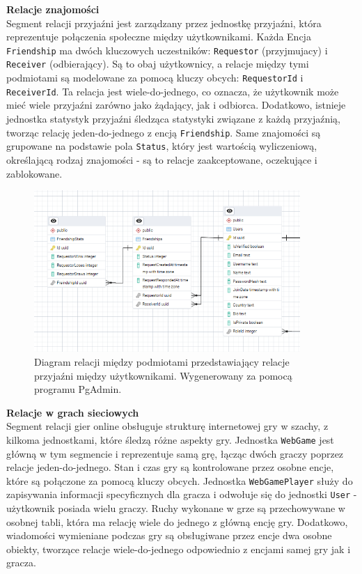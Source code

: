 \documentclass[12pt,a4paper]{article}
\begin{document}
\newpage

\noindent \textbf{Relacje znajomości}\\
Segment relacji przyjaźni jest zarządzany przez jednostkę przyjaźni, która reprezentuje połączenia społeczne między użytkownikami. Każda Encja \texttt{Friendship} ma dwóch kluczowych uczestników: \texttt{Requestor} (przyjmujacy) i \texttt{Receiver} (odbierający). Są to obaj użytkownicy, a relacje między tymi podmiotami są modelowane za pomocą kluczy obcych: \texttt{RequestorId} i \texttt{ReceiverId}. Ta relacja jest wiele-do-jednego, co oznacza, że użytkownik może mieć wiele przyjaźni zarówno jako żądający, jak i odbiorca. Dodatkowo, istnieje jednostka statystyk przyjaźni śledząca statystyki związane z każdą przyjaźnią, tworząc relację jeden-do-jednego z encją \texttt{Friendship}. Same znajomości są grupowane na podstawie pola \texttt{Status}, który jest wartością wyliczeniową, określającą rodzaj znajomości - są to relacje zaakceptowane, oczekujące i zablokowane.

\vspace{0.5cm}
\begin{figure}[h!]
    \centering
    \includegraphics[width=0.9\textwidth]{images/ERD_friendship.png}
    \caption{Diagram relacji między podmiotami przedstawiający relacje przyjaźni między użytkownikami. Wygenerowany za pomocą programu PgAdmin.}
\end{figure}

\newpage

\noindent \textbf{Relacje w grach sieciowych}\\
Segment relacji gier online obsługuje strukturę internetowej gry w szachy, z kilkoma jednostkami, które śledzą różne aspekty gry. Jednostka \texttt{WebGame} jest główną w tym segmencie i reprezentuje samą grę, łącząc dwóch graczy poprzez relacje jeden-do-jednego. Stan i czas gry są kontrolowane przez osobne encje, które są połączone za pomocą kluczy obcych. Jednostka \texttt{WebGamePlayer} służy do zapisywania informacji specyficznych dla gracza i odwołuje się do jednostki \texttt{User} - użytkownik posiada wielu graczy. Ruchy wykonane w grze są przechowywane w osobnej tabli, która ma relację wiele do jednego z główną encję gry. Dodatkowo, wiadomości wymieniane podczas gry są obsługiwane przez encje dwa osobne obiekty, tworzące relacje wiele-do-jednego odpowiednio z encjami samej gry jak i gracza.
\end{document}
